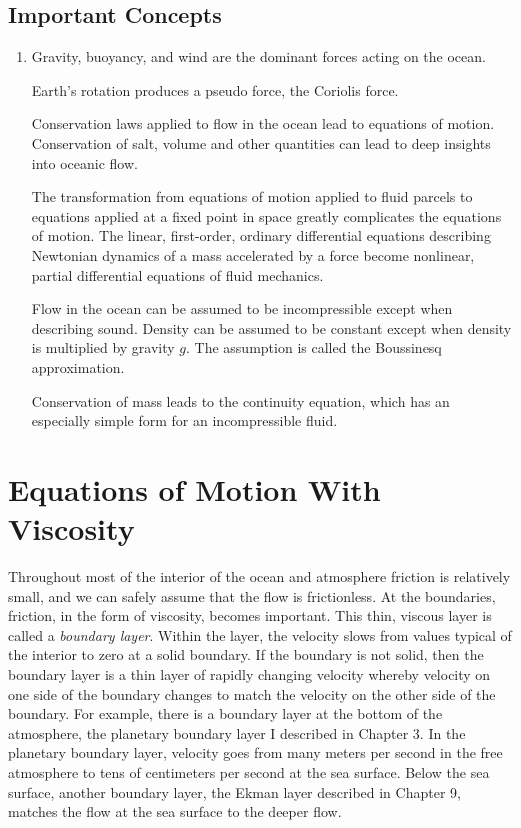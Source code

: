 \section{Important Concepts}
\begin{enumerate}
\item Gravity, buoyancy, and wind are the dominant
forces acting on the ocean.

\vitem Earth's rotation produces a pseudo force, the Coriolis force.

\vitem Conservation laws applied to flow in the ocean lead to
equations of motion. Conservation of salt, volume and other quantities
can lead to deep insights into oceanic flow.

\vitem The transformation from equations of motion applied to fluid
parcels to equations applied at a fixed point in space greatly
complicates the equations of motion. The linear, first-order, ordinary
differential equations describing Newtonian dynamics of a mass
accelerated by a force become nonlinear, partial differential
equations of fluid mechanics.

\vitem Flow in the ocean can be assumed to be incompressible except
when describing sound. Density can be assumed to be constant except
when density is multiplied by gravity $g$. The assumption is called
the Boussinesq approximation.

\vitem Conservation of mass leads to the continuity equation, which
has an especially simple form for an incompressible fluid.
\end{enumerate}


\chapter{Equations of Motion With Viscosity}
Throughout most of the interior of the ocean and atmosphere friction
is relatively small, and we can safely assume that the flow is
frictionless. At the boundaries, friction, in the form of viscosity,
becomes important. This thin, viscous layer is called a
\textit{boundary layer}. Within the
layer, the velocity slows from values typical of the interior to zero
at a solid boundary. If the boundary is not solid, then the boundary
layer is a thin layer of rapidly changing velocity whereby velocity on
one side of the boundary changes to match the velocity on the other
side of the boundary. For example, there is a boundary layer at the
bottom of the atmosphere, the planetary boundary layer I described in
Chapter 3. In the planetary boundary layer, velocity goes from many
meters per second in the free atmosphere to tens of centimeters per
second at the sea surface. Below the sea surface, another boundary
layer, the Ekman layer described in Chapter 9,
matches the flow at the sea surface to the deeper flow.

